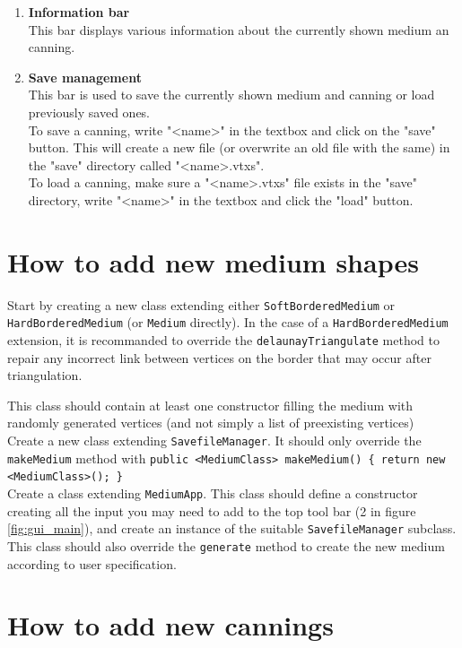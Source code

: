 \documentclass{report}
\begin{document}
\begin{enumerate}
	\item \textbf{Information bar}\\
	This bar displays various information about the currently shown medium an canning.
	
	\item \textbf{Save management}\\
	This bar is used to save the currently shown medium and canning or load previously saved ones.\\ 
	To save a canning, write "<name>" in the textbox and click on the "save" button. This will create a new file (or overwrite an old file with the same) in the "save" directory called "<name>.vtxs".\\
	To load a canning, make sure a "<name>.vtxs" file exists in the "save" directory, write "<name>" in the textbox and click the "load" button.
	
\end{enumerate}

\section{How to add new medium shapes}

Start by creating a new class extending either \verb|SoftBorderedMedium| or \verb|HardBorderedMedium| (or \verb|Medium| directly). In the case of a \verb|HardBorderedMedium| extension, it is recommanded to override the \verb|delaunayTriangulate| method to repair any incorrect link between vertices on the border that may occur after triangulation.

This class should contain at least one constructor filling the medium with randomly generated vertices (and not simply a list of preexisting vertices)\\

Create a new class extending \verb|SavefileManager|. It should only override the \verb|makeMedium| method with \verb|public <MediumClass> makeMedium() { return new <MediumClass>(); }|\\

Create a class extending \verb|MediumApp|. This class should define a constructor creating all the input you may need to add to the top tool bar (2 in figure \ref{fig:gui_main}), and create an instance of the suitable \verb|SavefileManager| subclass. This class should also override the \verb|generate| method to create the new medium according to user specification.

\section{How to add new cannings}
\end{document}
